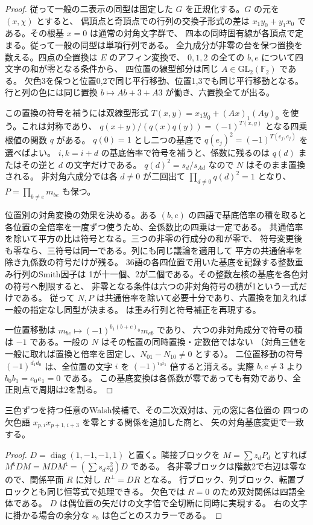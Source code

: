 \begin{proof}
従って一般の二表示の同型は固定した $G$ を正規化する。$G$ の元を $(x,\chi)$ とすると、
偶頂点と奇頂点での行列の交換子形式の差は
$x_1y_0+y_1x_0$ である。その根基 $x=0$ は通常の対角文字群で、
四本の同時固有線が各頂点で定まる。従って一般の同型は単項行列である。
全九成分が非零の台を保つ置換を数える。四点の全置換は $E$ のアフィン変換で、
$0,1,2$ の全ての $b,e$ について四文字の和が零となる条件から、
四位置の線型部分は同じ $A\in\mathrm{GL}_2(\mathbb F_2)$ である。
欠色3を保つと位置0,2で同じ平行移動、位置1,3でも同じ平行移動となる。
行と列の色には同じ置換 $b\mapsto Ab+3+A3$ が働き、六置換全てが出る。

この置換の符号を補うには双線型形式
$T(x,y)=x_1y_0+(Ax)_1(Ay)_0$ を使う。これは対称であり、
$q(x+y)/(q(x)q(y))=(-1)^{T(x,y)}$ となる四乗根値の関数 $q$ がある。
$q(0)=1$ とし二つの基底で $q(e_j)^2=(-1)^{T(e_j,e_j)}$ を選べばよい。
$i,k=i+d$ の基底倍率で符号を補うと、係数に残るのは $q(d)$ またはその逆と $d$ の文字だけである。
$q(d)^2=s_d/s_{Ad}$ なので $N$ はそのまま置換される。
非対角六成分では各 $d\ne0$ が二回出て $\prod_{d\ne0}q(d)^2=1$ となり、$P=\prod_{b\ne e}m_{be}$ も保つ。

位置別の対角変換の効果を決める。ある $(b,e)$ の四語で基底倍率の積を取ると
各位置の全倍率を一度ずつ使うため、全係数比の四乗は一定である。
共通倍率を除いて平方の比は符号となる。三つの非零の行成分の和が零で、
符号変更後も零なら、三符号は同一である。列にも同じ議論を適用して
平方の共通倍率を除き九係数の符号だけが残る。
36語の各四位置で用いた基底を記録する整数重み行列のSmith因子は
1が十一個、2が二個である。その整数左核の基底を各色対の符号へ制限すると、
非零となる条件は六つの非対角符号の積が1という一式だけである。
従って $N,P$ は共通倍率を除いて必要十分であり、六置換を加えれば一般の指定なし同型が決まる。
 は重み行列と符号補正を再現する。

一位置移動は $m_{be}\mapsto(-1)^{b_1(b+e)_0}m_{eb}$ であり、
六つの非対角成分で符号の積は $-1$ である。一般の $N$ はその転置の同時置換・定数倍ではない
（対角三値を一般に取れば置換と倍率を固定し、$N_{01}-N_{10}\ne0$ とする）。
二位置移動の符号 $(-1)^{d_1d_0}$ は、全位置の文字 $i$ を
$(-1)^{i_0i_1}$ 倍すると消える。実際 $b,e\ne3$ より $b_0 b_1=e_0 e_1=0$ である。
この基底変換は各係数が零であっても有効であり、全正則点で周期は2を割る。
\end{proof}

\begin{proposition}\label{prop:walsh-dual-square-cut}
三色ずつを持つ任意のWalsh候補で、その二次双対は、元の窓に各位置の
四つの欠色語 $x_{p,i}x_{p+1,i+3}$ を零とする関係を追加した商と、
矢の対角基底変更で一致する。
\end{proposition}
\begin{proof}
$D=\operatorname{diag}(1,-1,-1,1)$ と置く。隣接ブロックを
$M=\sum z_dP_d$ とすれば $M^{\mathsf t}DM=MDM^{\mathsf t}=(\sum s_d z_d^2)D$ である。
各非零ブロックは階数2で右辺は零なので、関係平面 $R$ に対し $R^\perp=DR$ となる。
行ブロック、列ブロック、転置ブロックとも同じ恒等式で処理できる。
欠色では $R=0$ のため双対関係は四語全体である。
$D$ は偶位置の矢だけの文字倍で全切断に同時に実現する。
右の文字に掛かる場合の余分な $s_b$ は色ごとのスカラーである。
\end{proof}

